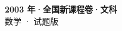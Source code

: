 \documentclass[zihao=-4, a4paper]{ctexart}
\begin{document}
\begin{center}
  {\Large\bfseries 2003 年·全国新课程卷·文科}\\[4pt]
  {\large 数学 · 试题版}
\end{center}
\medskip
{}

\end{document}

